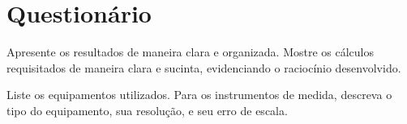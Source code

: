 \cleardoublepage


\vspace{15mm}

\begin{fullwidth}
\noindent{}
\vspace{5mm}

\noindent{}

\noindent{}

\noindent{}

\noindent{}

\noindent{}
\end{fullwidth}

\vspace{5mm}

\section{Questionário}
\begin{question}[type={exam}]{1}
Apresente os resultados de maneira clara e organizada. Mostre os cálculos requisitados de maneira clara e sucinta, evidenciando o raciocínio desenvolvido.
\end{question}

\begin{question}[type={exam}]{1.5}
Liste os equipamentos utilizados. Para os instrumentos de medida, descreva o tipo do equipamento, sua resolução, e seu erro de escala.
\end{question}

